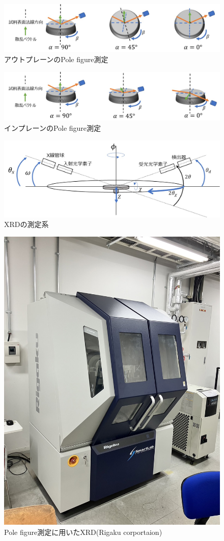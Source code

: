 \documentclass[dvipdfmx,12pt,a4paper]{jreport}
\begin{document}
			\begin{figure}[h]
				\centering
				\includegraphics[width=0.9\linewidth]{pole_figure_outplane.jpg}
				\caption{アウトプレーンのPole figure測定}
				\label{Pole_figure_outplane}
			\end{figure}
			\begin{figure}[h]
				\centering
				\includegraphics[width=0.9\linewidth]{pole_figure_inplane.jpg}
				\caption{インプレーンのPole figure測定}
				\label{Pole_figure_inplane}
			\end{figure}
			\begin{figure}[h]
				\centering
				\includegraphics[width=0.9\linewidth]{XRD_配置.jpg}
				\caption{XRDの測定系}
				\label{XRD_配置}
			\end{figure}
			\newpage
			\begin{figure}[h]
				\centering
				\includegraphics[width=0.5\linewidth]{smartlab.jpg}
				\caption{Pole figure測定に用いたXRD(Rigaku corportaion)}
				\label{XRD_pole_figure}
			\end{figure}
			\newpage
\end{document}
